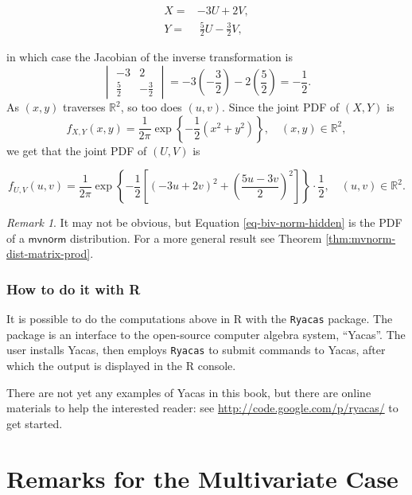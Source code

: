 \documentclass[]{book}
\numberwithin{equation}{chapter}
\numberwithin{figure}{chapter}
\theoremstyle{plain}
\theoremstyle{definition}
\theoremstyle{remark}
\theoremstyle{definition}
\theoremstyle{definition}
\theoremstyle{remark}
\newtheorem*{remark}{Remark}
\begin{document}
\begin{align*}
X= & -3U+2V,\\
Y= & \ \frac{5}{2}U-\frac{3}{2}V,
\end{align*}

in which case the Jacobian of the inverse transformation is
\[ \begin{vmatrix} -3 & 2\\ \frac{5}{2} & -\frac{3}{2} \end{vmatrix} = -3\left(-\frac{3}{2}\right)-2\left(\frac{5}{2}\right) = -\frac{1}{2}.\]
As \((x,y)\) traverses \(\mathbb{R}^{2}\), so too does \((u,v)\). Since
the joint PDF of \((X,Y)\) is \[
f_{X,Y}(x,y)=\frac{1}{2\pi}\exp\left\{ -\frac{1}{2}\left(x^{2}+y^{2}\right)\right\} ,\quad (x,y)\in\mathbb{R}^{2},
\] we get that the joint PDF of \((U,V)\) is

\begin{equation}
\label{eq-biv-norm-hidden}
f_{U,V}(u,v)=\frac{1}{2\pi}\exp\left\{ -\frac{1}{2}\left[\left(-3u+2v\right)^{2}+\left(\frac{5u-3v}{2}\right)^{2}\right]\right\} \cdot\frac{1}{2},\quad (u,v)\in\mathbb{R}^{2}.
\end{equation}

\bigskip

\begin{remark}
It may not be obvious, but Equation \eqref{eq-biv-norm-hidden} is the
PDF of a \(\mathsf{mvnorm}\) distribution. For a more general result see
Theorem \ref{thm:mvnorm-dist-matrix-prod}.
\end{remark}

\subsubsection{How to do it with R}\label{sub-bivariate-transf-r}

It is possible to do the computations above in R with the
\texttt{Ryacas} package. The package is an interface to the open-source
computer algebra system, ``Yacas''. The user installs Yacas, then
employs \texttt{Ryacas} to submit commands to Yacas, after which the
output is displayed in the R console.

There are not yet any examples of Yacas in this book, but there are
online materials to help the interested reader: see
\url{http://code.google.com/p/ryacas/} to get started.

\section{Remarks for the Multivariate
Case}\label{sec-remarks-for-the-multivariate}
\end{document}
